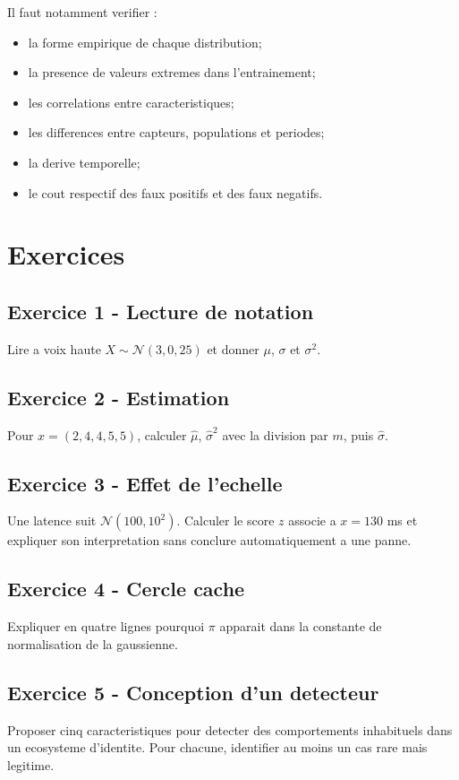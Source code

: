 Il faut notamment verifier :
\begin{itemize}
  \item la forme empirique de chaque distribution;
  \item la presence de valeurs extremes dans l'entrainement;
  \item les correlations entre caracteristiques;
  \item les differences entre capteurs, populations et periodes;
  \item la derive temporelle;
  \item le cout respectif des faux positifs et des faux negatifs.
\end{itemize}

\section{Exercices}

\subsection*{Exercice 1 - Lecture de notation}
Lire a voix haute $X\sim\mathcal N(3,0{,}25)$ et donner $\mu$, $\sigma$ et
$\sigma^2$.

\subsection*{Exercice 2 - Estimation}
Pour $x=(2,4,4,5,5)$, calculer $\widehat\mu$, $\widehat\sigma^2$ avec la
division par $m$, puis $\widehat\sigma$.

\subsection*{Exercice 3 - Effet de l'echelle}
Une latence suit $\mathcal N(100,10^2)$. Calculer le score $z$ associe a
$x=130$ ms et expliquer son interpretation sans conclure automatiquement a une
panne.

\subsection*{Exercice 4 - Cercle cache}
Expliquer en quatre lignes pourquoi $\pi$ apparait dans la constante de
normalisation de la gaussienne.

\subsection*{Exercice 5 - Conception d'un detecteur}
Proposer cinq caracteristiques pour detecter des comportements inhabituels dans
un ecosysteme d'identite. Pour chacune, identifier au moins un cas rare mais
legitime.

